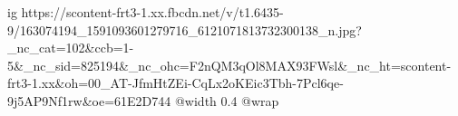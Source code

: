  
 
 
 
 

\ifcmt
  ig https://scontent-frt3-1.xx.fbcdn.net/v/t1.6435-9/163074194_1591093601279716_6121071813732300138_n.jpg?_nc_cat=102&ccb=1-5&_nc_sid=825194&_nc_ohc=F2nQM3qOl8MAX93FWsl&_nc_ht=scontent-frt3-1.xx&oh=00_AT-JfmHtZEi-CqLx2oKEic3Tbh-7Pcl6qe-9j5AP9Nf1rw&oe=61E2D744
  @width 0.4
  @wrap 
\fi
